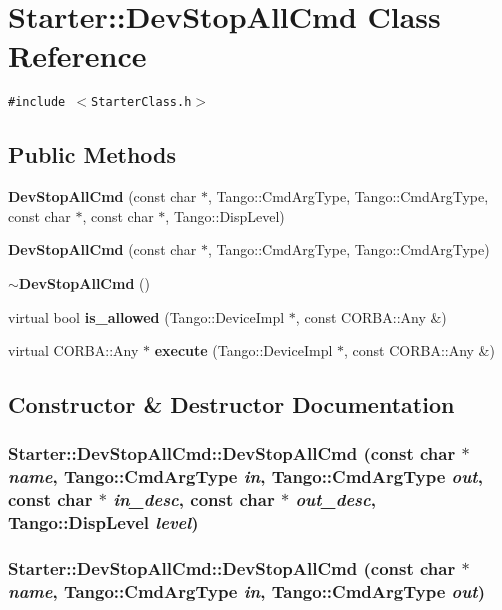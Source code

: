 \section{Starter::Dev\-Stop\-All\-Cmd  Class Reference}
\label{classStarter_1_1DevStopAllCmd}
{\tt \#include $<$Starter\-Class.h$>$}

\subsection*{Public Methods}
\begin{CompactItemize}
\item 
{\bf Dev\-Stop\-All\-Cmd} (const char $\ast$, Tango::Cmd\-Arg\-Type, Tango::Cmd\-Arg\-Type, const char $\ast$, const char $\ast$, Tango::Disp\-Level)
\item 
{\bf Dev\-Stop\-All\-Cmd} (const char $\ast$, Tango::Cmd\-Arg\-Type, Tango::Cmd\-Arg\-Type)
\item 
{\bf $\sim$Dev\-Stop\-All\-Cmd} ()
\item 
virtual bool {\bf is\_\-allowed} (Tango::Device\-Impl $\ast$, const CORBA::Any \&)
\item 
virtual CORBA::Any $\ast$ {\bf execute} (Tango::Device\-Impl $\ast$, const CORBA::Any \&)
\end{CompactItemize}


\subsection{Constructor \& Destructor Documentation}
\subsubsection{\setlength{\rightskip}{0pt plus 5cm}Starter::Dev\-Stop\-All\-Cmd::Dev\-Stop\-All\-Cmd (const char $\ast$ {\em name}, Tango::Cmd\-Arg\-Type {\em in}, Tango::Cmd\-Arg\-Type {\em out}, const char $\ast$ {\em in\_\-desc}, const char $\ast$ {\em out\_\-desc}, Tango::Disp\-Level {\em level})}\label{classStarter_1_1DevStopAllCmd_a0}


\subsubsection{\setlength{\rightskip}{0pt plus 5cm}Starter::Dev\-Stop\-All\-Cmd::Dev\-Stop\-All\-Cmd (const char $\ast$ {\em name}, Tango::Cmd\-Arg\-Type {\em in}, Tango::Cmd\-Arg\-Type {\em out})}\label{classStarter_1_1DevStopAllCmd_a1}


